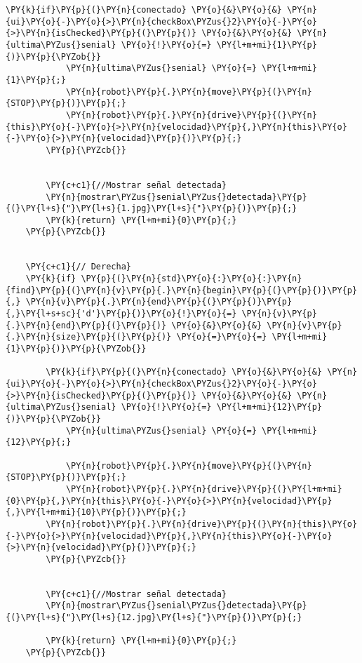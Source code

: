 \begin{Verbatim}[commandchars=\\\{\}]
        \PY{k}{if}\PY{p}{(}\PY{n}{conectado} \PY{o}{&}\PY{o}{&} \PY{n}{ui}\PY{o}{-}\PY{o}{>}\PY{n}{checkBox\PYZus{}2}\PY{o}{-}\PY{o}{>}\PY{n}{isChecked}\PY{p}{(}\PY{p}{)} \PY{o}{&}\PY{o}{&} \PY{n}{ultima\PYZus{}senial} \PY{o}{!}\PY{o}{=} \PY{l+m+mi}{1}\PY{p}{)}\PY{p}{\PYZob{}}
            \PY{n}{ultima\PYZus{}senial} \PY{o}{=} \PY{l+m+mi}{1}\PY{p}{;}
            \PY{n}{robot}\PY{p}{.}\PY{n}{move}\PY{p}{(}\PY{n}{STOP}\PY{p}{)}\PY{p}{;}
            \PY{n}{robot}\PY{p}{.}\PY{n}{drive}\PY{p}{(}\PY{n}{this}\PY{o}{-}\PY{o}{>}\PY{n}{velocidad}\PY{p}{,}\PY{n}{this}\PY{o}{-}\PY{o}{>}\PY{n}{velocidad}\PY{p}{)}\PY{p}{;}
        \PY{p}{\PYZcb{}}


        \PY{c+c1}{//Mostrar señal detectada}
        \PY{n}{mostrar\PYZus{}senial\PYZus{}detectada}\PY{p}{(}\PY{l+s}{"}\PY{l+s}{1.jpg}\PY{l+s}{"}\PY{p}{)}\PY{p}{;}
        \PY{k}{return} \PY{l+m+mi}{0}\PY{p}{;}
    \PY{p}{\PYZcb{}}


    \PY{c+c1}{// Derecha}
    \PY{k}{if} \PY{p}{(}\PY{n}{std}\PY{o}{:}\PY{o}{:}\PY{n}{find}\PY{p}{(}\PY{n}{v}\PY{p}{.}\PY{n}{begin}\PY{p}{(}\PY{p}{)}\PY{p}{,} \PY{n}{v}\PY{p}{.}\PY{n}{end}\PY{p}{(}\PY{p}{)}\PY{p}{,}\PY{l+s+sc}{'d'}\PY{p}{)}\PY{o}{!}\PY{o}{=} \PY{n}{v}\PY{p}{.}\PY{n}{end}\PY{p}{(}\PY{p}{)} \PY{o}{&}\PY{o}{&} \PY{n}{v}\PY{p}{.}\PY{n}{size}\PY{p}{(}\PY{p}{)} \PY{o}{=}\PY{o}{=} \PY{l+m+mi}{1}\PY{p}{)}\PY{p}{\PYZob{}}

        \PY{k}{if}\PY{p}{(}\PY{n}{conectado} \PY{o}{&}\PY{o}{&} \PY{n}{ui}\PY{o}{-}\PY{o}{>}\PY{n}{checkBox\PYZus{}2}\PY{o}{-}\PY{o}{>}\PY{n}{isChecked}\PY{p}{(}\PY{p}{)} \PY{o}{&}\PY{o}{&} \PY{n}{ultima\PYZus{}senial} \PY{o}{!}\PY{o}{=} \PY{l+m+mi}{12}\PY{p}{)}\PY{p}{\PYZob{}}
            \PY{n}{ultima\PYZus{}senial} \PY{o}{=} \PY{l+m+mi}{12}\PY{p}{;}

            \PY{n}{robot}\PY{p}{.}\PY{n}{move}\PY{p}{(}\PY{n}{STOP}\PY{p}{)}\PY{p}{;}
            \PY{n}{robot}\PY{p}{.}\PY{n}{drive}\PY{p}{(}\PY{l+m+mi}{0}\PY{p}{,}\PY{n}{this}\PY{o}{-}\PY{o}{>}\PY{n}{velocidad}\PY{p}{,}\PY{l+m+mi}{10}\PY{p}{)}\PY{p}{;}
        \PY{n}{robot}\PY{p}{.}\PY{n}{drive}\PY{p}{(}\PY{n}{this}\PY{o}{-}\PY{o}{>}\PY{n}{velocidad}\PY{p}{,}\PY{n}{this}\PY{o}{-}\PY{o}{>}\PY{n}{velocidad}\PY{p}{)}\PY{p}{;}
        \PY{p}{\PYZcb{}}


        \PY{c+c1}{//Mostrar señal detectada}
        \PY{n}{mostrar\PYZus{}senial\PYZus{}detectada}\PY{p}{(}\PY{l+s}{"}\PY{l+s}{12.jpg}\PY{l+s}{"}\PY{p}{)}\PY{p}{;}

        \PY{k}{return} \PY{l+m+mi}{0}\PY{p}{;}
    \PY{p}{\PYZcb{}}


\end{Verbatim}
